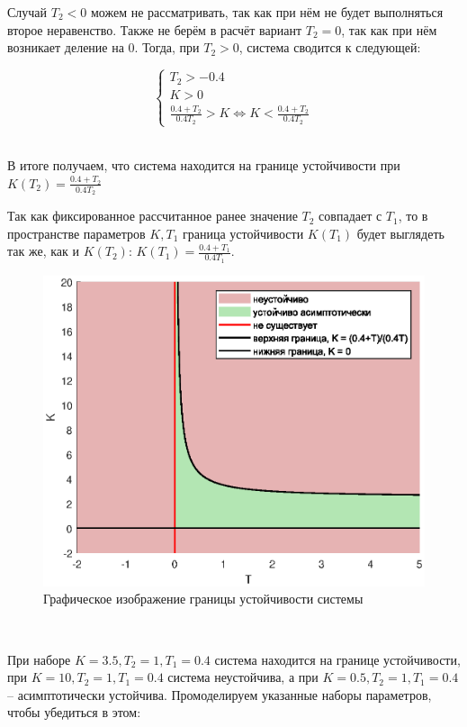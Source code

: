 \documentclass[a4paper]{article}
\begin{document}
Случай $T_2<0$ можем не рассматривать, так как при нём не будет выполняться второе неравенство. Также не берём в расчёт вариант $T_2 = 0$, так как при нём возникает деление на 0. Тогда, при $T_2 > 0$, система сводится к следующей:

$$
\begin{cases}
    T_2>-0.4 \\
    K>0\\
    \frac{0.4+T_2}{0.4T_2}>K \Leftrightarrow K<\frac{0.4+T_2}{0.4T_2}
\end{cases}
$$\

В итоге получаем, что система находится на границе устойчивости при $K(T_2) = \frac{0.4+T_2}{0.4T_2}$\ 

Так как фиксированное рассчитанное ранее значение $T_2$ совпадает с $T_1$, то в пространстве параметров $K, T_1$ граница устойчивости $K(T_1)$ будет выглядеть так же, как и $K(T_2)$: $K(T_1) = \frac{0.4+T_1}{0.4T_1}$.\ 

\begin{figure}
    \centering
    \includegraphics[width=0.75\linewidth]{ex2/border.eps}
    \caption{Графическое изображение границы устойчивости системы}
\end{figure}\

При наборе $K = 3.5, T_2 = 1, T_1 = 0.4$ система находится на границе устойчивости, при $K = 10, T_2 = 1, T_1 = 0.4$ система неустойчива, а при $K = 0.5, T_2 = 1, T_1 = 0.4$ -- асимптотически устойчива. Промоделируем указанные наборы параметров, чтобы убедиться в этом:
\end{document}
